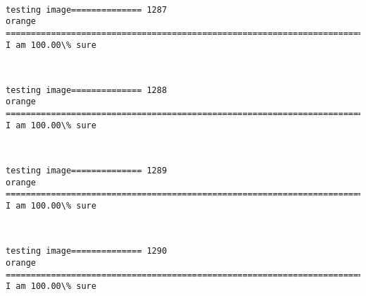 \documentclass[11pt]{article}
\begin{document}
    \begin{center}
    \end{center}
    { \hspace*{\fill} \\}
    
    \begin{Verbatim}[commandchars=\\\{\}]
testing image============== 1287
orange
============================================================================
I am 100.00\% sure

    \end{Verbatim}

    \begin{center}
    \end{center}
    { \hspace*{\fill} \\}
    
    \begin{Verbatim}[commandchars=\\\{\}]
testing image============== 1288
orange
============================================================================
I am 100.00\% sure

    \end{Verbatim}

    \begin{center}
    \end{center}
    { \hspace*{\fill} \\}
    
    \begin{Verbatim}[commandchars=\\\{\}]
testing image============== 1289
orange
============================================================================
I am 100.00\% sure

    \end{Verbatim}

    \begin{center}
    \end{center}
    { \hspace*{\fill} \\}
    
    \begin{Verbatim}[commandchars=\\\{\}]
testing image============== 1290
orange
============================================================================
I am 100.00\% sure

    \end{Verbatim}
\end{document}
